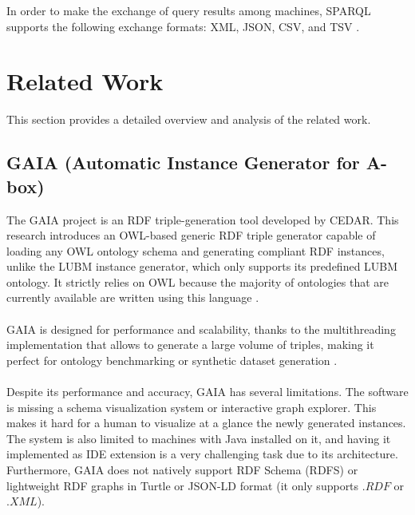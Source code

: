 In order to make the exchange of query results among machines, SPARQL supports the following exchange formats: XML, JSON, CSV, and TSV \cite{sparql}.



\section{Related Work \label{sec:tech}}

This section provides a detailed overview and analysis of the related work.

\subsection{GAIA (Automatic Instance Generator for A-box) \label{sec:gaia}}

The GAIA project is an RDF triple-generation tool developed by CEDAR. 
This research introduces an OWL-based generic RDF triple generator capable of loading any OWL ontology schema and generating compliant RDF instances, unlike the LUBM instance generator, which only supports its predefined LUBM ontology.
It strictly relies on OWL because the majority of ontologies that are currently available are written using this language \cite{raynaud2014gaia}.
\\
\\
GAIA is designed for performance and scalability, thanks to the multithreading implementation that allows to generate a large volume of triples, making it perfect for ontology benchmarking or synthetic dataset generation \cite{raynaud2014gaia}.
\\
\\
Despite its performance and accuracy, GAIA has several limitations. The software is missing a schema visualization system or interactive graph explorer. This makes it hard for a human to visualize at a glance the newly generated instances.
The system is also limited to machines with Java installed on it, and having it implemented as IDE extension is a very challenging task due to its architecture.
\\
Furthermore, GAIA does not natively support RDF Schema (RDFS) or lightweight RDF graphs in Turtle or JSON-LD format (it only supports $.RDF$ or $.XML$).

